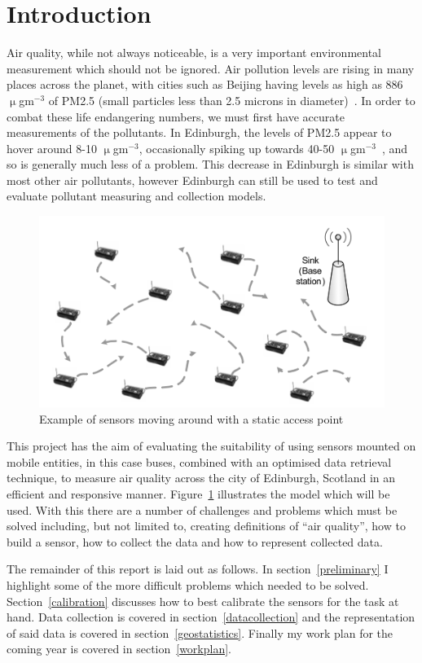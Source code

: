 \section{Introduction}\label{intro}


Air quality, while not always noticeable, is a very important environmental measurement which should not be ignored. Air pollution levels are rising in many places across the planet, with cities such as Beijing having levels as high as 886 $\upmu$gm$^{-3}$ of PM2.5 (small particles less than 2.5 microns in diameter)~\cite{beijinghightwitter}. In order to combat these life endangering numbers, we must first have accurate measurements of the pollutants. In Edinburgh, the levels of PM2.5 appear to hover around 8-10 $\upmu$gm$^{-3}$, occasionally spiking up towards 40-50 $\upmu$gm$^{-3}$~\cite{pm2point5inscotland}, and so is generally much less of a problem. This decrease in Edinburgh is similar with most other air pollutants, however Edinburgh can still be used to test and evaluate pollutant measuring and collection models. 

\begin{figure}[H]
    \begin{center}
        \includegraphics[scale=0.6]{./images/mpp1/BusModel.png}
        \caption{Example of sensors moving around with a static access point}
        \label{fig:busmodel}
    \end{center}
\end{figure}

This project has the aim of evaluating the suitability of using sensors mounted on mobile entities, in this case buses, combined with an optimised data retrieval technique, to measure air quality across the city of Edinburgh, Scotland in an efficient and responsive manner. Figure~\ref{fig:busmodel} illustrates the model which will be used. With this there are a number of challenges and problems which must be solved including, but not limited to, creating definitions of ``air quality'', how to build a sensor, how to collect the data and how to represent collected data. 

The remainder of this report is laid out as follows. In section~\ref{preliminary} I highlight some of the more difficult problems which needed to be solved. Section~\ref{calibration} discusses how to best calibrate the sensors for the task at hand. Data collection is covered in section~\ref{datacollection} and the representation of said data is covered in section~\ref{geostatistics}. Finally my work plan for the coming year is covered in section~\ref{workplan}.


